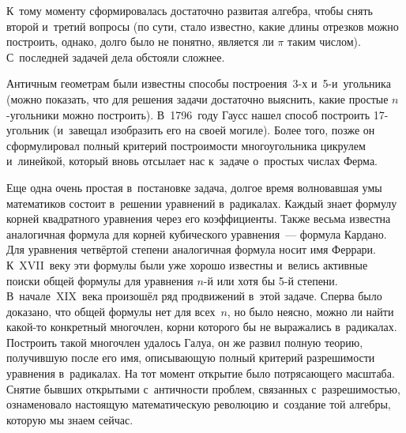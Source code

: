 \documentclass{article}
\begin{document}
К~тому моменту сформировалась достаточно развитая алгебра, чтобы снять второй
и~третий вопросы (по сути, стало известно, какие длины отрезков можно
построить, однако, долго было не понятно, является ли $\pi$ таким числом).
С~последней задачей дела обстояли сложнее.

Античным геометрам были известны способы построения~3-х и~5-и~угольника (можно
показать, что для решения задачи достаточно выяснить, какие простые
$n$-угольники можно построить). В~1796~году Гаусс нашел способ построить
17-угольник (и~завещал изобразить его на своей могиле). Более того, позже
он сформулировал полный критерий построимости многоугольника цикрулем
и~линейкой, который вновь отсылает нас к~задаче о~простых числах Ферма.

Еще одна очень простая в~постановке задача, долгое время волновавшая умы
математиков состоит в~решении уравнений в~радикалах. Каждый знает формулу
корней квадратного уравнения через его коэффициенты. Также весьма известна
аналогичная формула для корней кубического уравнения~--- формула Кардано.
Для уравнения четвёртой степени аналогичная формула носит имя Феррари.
К~XVII~веку эти формулы были уже хорошо известны и~велись активные поиски
общей формулы для уравнения $n$-й или хотя бы 5-й степени. В~начале~XIX~века
произошёл ряд продвижений в~этой задаче. Сперва было доказано, что общей
формулы нет для всех~$n$, но было неясно, можно ли найти какой-то конкретный
многочлен, корни которого бы не выражались в~радикалах. Построить такой
многочлен удалось Галуа, он же развил полную теорию, получившую после его имя,
описывающую полный критерий разрешимости уравнения в~радикалах. На тот момент
открытие было потрясающего масштаба. Снятие бывших открытыми с~античности
проблем, связанных с~разрешимостью, ознаменовало настоящую математическую
революцию и~создание той алгебры, которую мы знаем сейчас.
\end{document}
